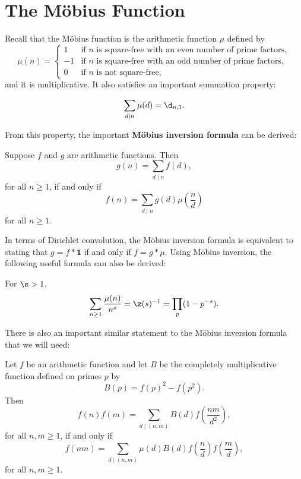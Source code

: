   \section{The M\"obius Function}\label{append:The_Mobius_Function}
    Recall that the M\"obius function is the arithmetic function $\mu$ defined by
    \[
      \mu(n) = \begin{cases} 1 & \text{if $n$ is square-free with an even number of prime factors}, \\ -1 & \text{if $n$ is square-free with an odd number of prime factors}, \\ 0 & \text{if $n$ is not square-free}, \end{cases}
    \]
    and it is multiplicative. It also satisfies an important summation property:

    \begin{proposition}\label{prop:Mobius_dirac_delta}
      \[
        \sum_{d \mid n}\mu(d) = \d_{n,1}.
      \]
    \end{proposition}

    From this property, the important \textbf{M\"obius inversion formula} can be derived:

    \begin{theorem}
      Suppose $f$ and $g$ are arithmetic functions. Then
      \[
        g(n) = \sum_{d \mid n}f(d),
      \]
      for all $n \ge 1$, if and only if
      \[
        f(n) = \sum_{d \mid n}g(d)\mu\left(\frac{n}{d}\right)
      \]
      for all $n \ge 1$.
    \end{theorem}

    In terms of Dirichlet convolution, the M\"obius inversion formula is equivalent to stating that $g = f \ast \mathbf{1}$ if and only if $f = g \ast \mu$. Using M\"obius inversion, the following useful formula can also be derived:

    \begin{proposition}\label{prop:Dirichlet_Mobius_is_zeta_inverse}
      For $\s > 1$,
      \[
        \sum_{n \ge 1}\frac{\mu(n)}{n^{s}} = \z(s)^{-1} = \prod_{p}(1-p^{-s}).
      \]
    \end{proposition}

    There is also an important similar statement to the M\"obius inversion formula that we will need:

    \begin{theorem}\label{thm:specially_multiplicative_functions}
      Let $f$ be an arithmetic function and let $B$ be the completely multiplicative function defined on primes $p$ by
      \[
        B(p) = f(p)^{2}-f(p^{2}).
      \]
      Then
      \[
        f(n)f(m) = \sum_{d \mid (n,m)}B(d)f\left(\frac{nm}{d^{2}}\right),
      \]
      for all $n,m \ge 1$, if and only if
      \[
        f(nm) = \sum_{d \mid (n,m)}\mu(d)B(d)f\left(\frac{n}{d}\right)f\left(\frac{m}{d}\right),
      \]
      for all $n,m \ge 1$.
    \end{theorem}

